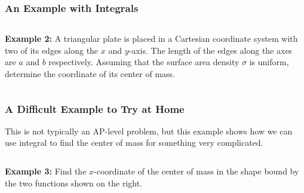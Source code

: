 \documentclass[12pt,compress,aspectratio=169]{beamer}
\begin{document}
\begin{frame}
  \frametitle{An Example with Integrals}
  \begin{columns}
    \textbf{Example 2:} A triangular plate is placed in a Cartesian coordinate
    system with two of its edges along the $x$ and $y$-axis. The length of the
    edges along the axes are $a$ and $b$ respectively. Assuming that the
    surface area density $\sigma$ is uniform, determine the coordinate of its
    center of mass.

  \end{columns}
\end{frame}


\begin{frame}
  \frametitle{A Difficult Example to Try at Home}
  This is not typically an AP-level problem, but this example shows how we
  can use integral to find the center of mass for something very complicated.
  \begin{columns}
    \textbf{Example 3:} Find the $x$-coordinate of the center of mass in the
    shape bound by the two functions shown on the right.

  \end{columns}
\end{frame}
\end{document}
